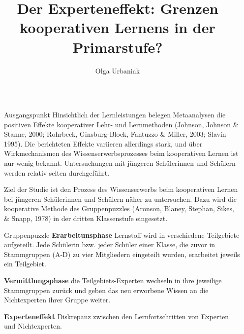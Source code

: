 \documentclass[final]{beamer}
\title{Der Experteneffekt: Grenzen kooperativen Lernens in der Primarstufe?} %
\author{Olga Urbaniak} %
\institute{FU Berlin} %
\newlength{\sepwid}
\newlength{\onecolwid}
\begin{document}
\setlength{\belowcaptionskip}{2ex} %
\setlength\belowdisplayshortskip{2ex} %
\begin{frame}[t] %
\begin{columns}[t] %


\begin{column}{\sepwid}\end{column} %
\begin{column}{\onecolwid} %

\begin{block}{Ausgangspunkt}
Hinsichtlich der Lernleistungen  belegen Metaanalysen die positiven Effekte kooperativer Lehr- und Lernmethoden (Johnson, Johnson \& Stanne, 2000; Rohrbeck, Ginsburg-Block, Fantuzzo \& Miller, 2003; Slavin 1995). Die berichteten Effekte variieren allerdings stark, und über Wirkmechanismen des Wissenserwerbsprozesses beim kooperativen Lernen ist nur wenig bekannt. Untersuchungen mit jüngeren Schülerinnen und Schülern werden relativ selten durchgeführt. 

Ziel der Studie ist den Prozess des Wissenserwerbs beim kooperativen Lernen bei jüngeren Schülerinnen und Schülern näher zu untersuchen. Dazu wird die kooperative Methode des Gruppenpuzzles (Aronson, Blaney, Stephan, Sikes, \& Snapp, 1978) in der dritten Klassenstufe eingesetzt.
\end{block}

\begin{alertblock}{Gruppenpuzzle}
\textbf{Erarbeitunsphase} Lernstoff wird in verschiedene Teilgebiete aufgeteilt. Jede Schülerin bzw. jeder Schüler einer Klasse, die zuvor in Stammgruppen (A-D) zu vier Mitgliedern eingeteilt wurden, erarbeitet jeweils ein Teilgebiet. 

\textbf{Vermittlungsphase} die Teilgebiets-Experten wechseln in ihre jeweilige Stammgruppen zurück und geben das neu erworbene Wissen an die Nichtexperten ihrer Gruppe weiter. 

\textbf{Experteneffekt} Diskrepanz zwischen den Lernfortschritten von Experten und Nichtexperten.
\end{alertblock}



\end{column}
\end{columns}
\end{frame}
\end{document}
